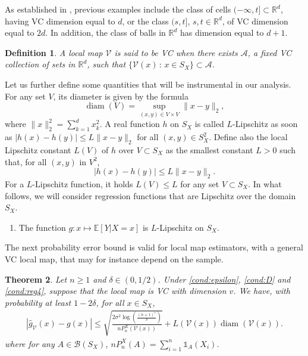 \documentclass[paper=a4, fontsize=11pt]{scrartcl}
\newcommand{\diam}{\operatorname{diam}}
\newcommand{\ind}{\mathds{1}}
\newcommand{\PP}{\mathbb{P}}
\newcommand{\RR}{\mathbb{R}}
\newtheorem{theorem}{Theorem}
\newtheorem{definition}[theorem]{Definition}
\begin{document}
As established in \cite{wenocur1981some}, previous examples include the class of cells $(-\infty , t]\subset \mathbb R^d$, having VC dimension equal to $d$, or the class $( s , t]$, $s,t\in \RR^d$, of VC dimension equal to $2d$. In addition, the class of balls in $\mathbb R^d$ has dimension equal to $d+1$. 
\begin{definition}
 A local map $\mathcal V$ is said to be VC when there exists $\mathcal A$, a fixed VC collection of sets in $\mathbb R^d$, such that $\{\mathcal V (x) \, :\, x\in S_X\} \subset \mathcal A$.
\end{definition}
Let us further define some quantities that will be instrumental in our analysis. For any set $V$, its diameter is given by the formula
$$ \diam (V)  = \sup_{(x,y)\in V\times V} \|x-y\|_2,$$
where $\|x\|_2^2 = \sum_{k=1} ^d x_k^2$. A real function $h$ on $S_X$ is called $L$-Lipschitz as soon as $ | h(x) - h(y) |\leq L \|x-y\|_2$ for all $(x,y)\in S_X^2$.
 Define also the local Lipschitz constant $ L(V)$ of $h$ over $V\subset S_X$ as the smallest constant $L>0$ such that, for all $(x ,y)$ in $V^2$,
$$     |h(x) - h(y) | \leq L  \|  x-y\|_2.$$
For a $L$-Lipschitz function, it holds $L(V)\leq L$ for any set $V\subset S_X$. In what follows, we will consider regression functions that are Lipschitz over the domain $S_X$.

\begin{enumerate}[label=(L), wide=0.5em,  leftmargin=*]
  \item \label{cond:reg4} The function \( g: x \mapsto \mathbb E [ Y|X= x]\) is $L$-Lipschitz on \( S_X \). %
\end{enumerate}

The next probability error bound is valid for local map estimators, with a general VC local map, that may for instance depend on the sample.

\begin{theorem}\label{th:general}
Let $n\geq 1$ and $\delta \in (0,1/2) $. Under \ref{cond:epsilon}, \ref{cond:D} and \ref{cond:reg4}, suppose that the local map is VC with dimension $v$. We have, with probability at least $1 - 2 \delta $, for all $x\in S_X$,
        \begin{align*}
       |  \hat g_{\mathcal V}(x) - g(x)| \leq \sqrt{\frac{ 2 \sigma^2 \log\left( \frac{ (n+1) ^v }{\delta} \right)}{ n P_n^X(\mathcal V (x))  } } + L(\mathcal V(x)  ) \diam  (\mathcal V(x) )  .
    \end{align*}
    where for any $A\in \mathcal B(S_X)$, $n P_n^X(A)  = \sum_{i=1} ^n \ind _A(X_i) $.
\end{theorem}
\end{document}
